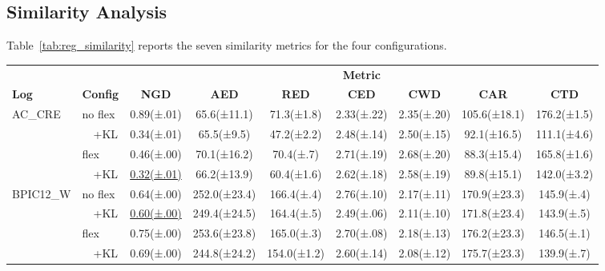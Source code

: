 \documentclass[journal,onecolumn]{IEEEtran}
\begin{document}
\subsection{Similarity Analysis}
\label{subsec:reg_similarity}

Table~\ref{tab:reg_similarity} reports the seven similarity metrics for
the four configurations.

\begin{table}[!ht]
\centering\scriptsize
\setlength{\tabcolsep}{3pt}
\renewcommand{\arraystretch}{1.1}
\begin{tabular}{ll ccccccc}
\toprule
& & \multicolumn{7}{c}{\textbf{Metric}} \\
\cmidrule(lr){3-3}\cmidrule(lr){4-5}\cmidrule(lr){6-7}\cmidrule(lr){8-9}
\textbf{Log} & \textbf{Config}
  & \textbf{NGD}
  & \textbf{AED} & \textbf{RED}
  & \textbf{CED} & \textbf{CWD}
  & \textbf{CAR} & \textbf{CTD} \\
\midrule
\multirow{4}{*}{AC\_CRE}
  & no flex   & 0.89{\tiny(±.01)} & 65.6{\tiny(±11.1)} & 71.3{\tiny(±1.8)} & 2.33{\tiny(±.22)} & 2.35{\tiny(±.20)} & 105.6{\tiny(±18.1)} & 176.2{\tiny(±1.5)} \\
  & ~~+KL     & 0.34{\tiny(±.01)} & 65.5{\tiny(±9.5)} & 47.2{\tiny(±2.2)} & 2.48{\tiny(±.14)} & 2.50{\tiny(±.15)} & 92.1{\tiny(±16.5)} & 111.1{\tiny(±4.6)} \\
  & flex      & 0.46{\tiny(±.00)} & 70.1{\tiny(±16.2)} & 70.4{\tiny(±.7)} & 2.71{\tiny(±.19)} & 2.68{\tiny(±.20)} & 88.3{\tiny(±15.4)} & 165.8{\tiny(±1.6)} \\
  & ~~+KL     & \underline{0.32{\tiny(±.01)}} & 66.2{\tiny(±13.9)} & 60.4{\tiny(±1.6)} & 2.62{\tiny(±.18)} & 2.58{\tiny(±.19)} & 89.8{\tiny(±15.1)} & 142.0{\tiny(±3.2)} \\
\midrule
\multirow{4}{*}{BPIC12\_W}
  & no flex   & 0.64{\tiny(±.00)} & 252.0{\tiny(±23.4)} & 166.4{\tiny(±.4)} & 2.76{\tiny(±.10)} & 2.17{\tiny(±.11)} & 170.9{\tiny(±23.3)} & 145.9{\tiny(±.4)} \\
  & ~~+KL     & \underline{0.60{\tiny(±.00)}} & 249.4{\tiny(±24.5)} & 164.4{\tiny(±.5)} & 2.49{\tiny(±.06)} & 2.11{\tiny(±.10)} & 171.8{\tiny(±23.4)} & 143.9{\tiny(±.5)} \\
  & flex      & 0.75{\tiny(±.00)} & 253.6{\tiny(±23.8)} & 165.0{\tiny(±.3)} & 2.70{\tiny(±.08)} & 2.18{\tiny(±.13)} & 176.2{\tiny(±23.3)} & 146.5{\tiny(±.1)} \\
  & ~~+KL     & 0.69{\tiny(±.00)} & 244.8{\tiny(±24.2)} & 154.0{\tiny(±1.2)} & 2.60{\tiny(±.14)} & 2.08{\tiny(±.12)} & 175.7{\tiny(±23.3)} & 139.9{\tiny(±.7)} \\

\end{tabular}
\end{table}
\end{document}
